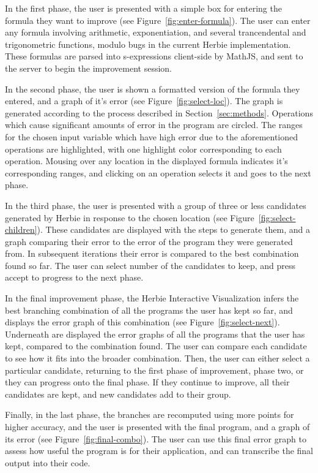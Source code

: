 \documentclass{chi2009}
\begin{document}
In the first phase, the user is presented with a simple box for
entering the formula they want to improve (see
Figure~\ref{fig:enter-formula}). The user can enter any formula
involving arithmetic, exponentiation, and several trancendental and
trigonometric functions, modulo bugs in the current Herbie
implementation. These formulas are parsed into s-expressions
client-side by MathJS, and sent to the server to begin the improvement
session.

In the second phase, the user is shown a formatted version of the
formula they entered, and a graph of it's error (see
Figure~\ref{fig:select-loc}). The graph is generated according to the
process described in Section~\ref{sec:methods}. Operations which cause
significant amounts of error in the program are circled. The ranges
for the chosen input variable which have high error due to the
aforementioned operations are highlighted, with one highlight color
corresponding to each operation. Mousing over any location in the
displayed formula indicates it's corresponding ranges, and clicking on
an operation selects it and goes to the next phase.

In the third phase, the user is presented with a group of three or
less candidates generated by Herbie in response to the chosen location
(see Figure~\ref{fig:select-children}). These candidates are displayed
with the steps to generate them, and a graph comparing their error to
the error of the program they were generated from. In subsequent
iterations their error is compared to the best combination found so
far. The user can select number of the candidates to keep, and press
accept to progress to the next phase.

In the final improvement phase, the Herbie Interactive Visualization
infers the best branching combination of all the programs the user has
kept so far, and displays the error graph of this combination (see
Figure~\ref{fig:select-next}). Underneath are displayed the error
graphs of all the programs that the user has kept, compared to the
combination found. The user can compare each candidate to see how it
fits into the broader combination. Then, the user can either select a
particular candidate, returning to the first phase of improvement,
phase two, or they can progress onto the final phase. If they continue
to improve, all their candidates are kept, and new candidates add to
their group.

Finally, in the last phase, the branches are recomputed using more
points for higher accuracy, and the user is presented with the final
program, and a graph of its error (see
Figure~\ref{fig:final-combo}). The user can use this final error graph
to assess how useful the program is for their application, and can
transcribe the final output into their code.
\end{document}

